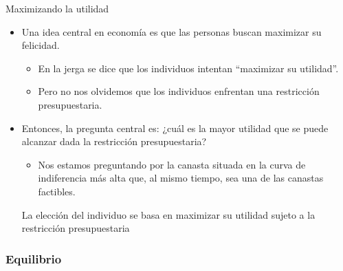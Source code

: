 \documentclass{beamer}
\begin{document}
\begin{frame}{Maximizando la utilidad}
    \begin{itemize}
        \item Una idea central en economía es que las personas buscan maximizar su felicidad. \vspace{2mm}
        \begin{itemize}
        \item En la jerga se dice que los individuos intentan ``maximizar su utilidad''. \vspace{2mm}
        \item Pero no nos olvidemos que los individuos enfrentan una restricción presupuestaria. \vspace{2mm}
        \end{itemize} 
        \item Entonces, la pregunta central es: ¿cuál es la mayor utilidad que se puede alcanzar dada la restricción presupuestaria? \vspace{2mm}
        \begin{itemize}
        \item Nos estamos preguntando por la canasta situada en la curva de indiferencia más alta que, al mismo tiempo, sea una de las canastas factibles. 
        \vspace{2mm}
        \end{itemize} 
        \begin{boxB}
        \centering La elección del individuo se basa en maximizar su utilidad sujeto a la restricción presupuestaria
        \end{boxB}
        \end{itemize}
\end{frame}

\begin{frame}
    \frametitle{Equilibrio}
    \begin{center}
    \end{center}
\end{frame}
\end{document}
